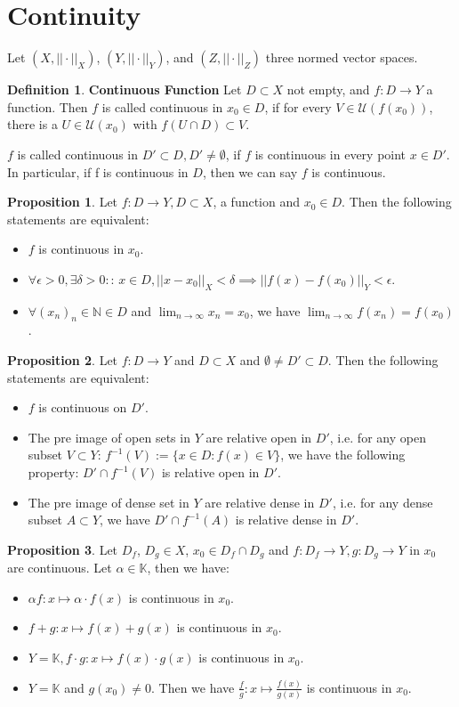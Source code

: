 \documentclass{article}
\theoremstyle{definition}
\newtheorem{defi}{Definition}[subsection]
\newtheorem{prop}{Proposition}[subsection]
\begin{document}
\section{Continuity}
Let $(X, ||\cdot||_X)$, $(Y, ||\cdot||_Y)$, and $(Z, ||\cdot||_Z)$ three normed vector spaces.
\begin{defi}
\textbf{Continuous Function} Let $D\subset X$ not empty, and $f: D\to Y$ a function. Then $f$ is called continuous in $x_0\in D$, if for every $V\in \mathcal{U}(f(x_0))$, there is a $U\in \mathcal{U}(x_0)$ with $f(U\cap D)\subset V$.

$f$ is called continuous in $D' \subset D, D' \neq \emptyset$, if $f$ is continuous in every point $x\in D'$. In particular, if f is continuous in $D$, then we can say $f$ is continuous. 
\end{defi}
\begin{prop}
Let $f: D\to Y, D\subset X$, a function and $x_0 \in D$. Then the following statements are equivalent:
\begin{itemize}
    \item $f$ is continuous in $x_0$.
    \item $\forall \epsilon>0, \exists\delta>0:$: $x\in D, ||x-x_0||_X <\delta \implies ||f(x)-f(x_0)||_Y<\epsilon$.
    \item $\forall (x_n)_n\in\mathbb{N}\in D$ and $\lim_{n\to\infty}x_n=x_0$, we have $\lim_{n\to\infty}f(x_n) = f(x_0)$.
\end{itemize}
\end{prop}
\begin{prop}
Let $f: D\to Y$ and $D\subset X$ and $\emptyset \neq D'\subset D$. Then the following statements are equivalent:
\begin{itemize}
    \item $f$ is continuous on $D'$.
    \item The pre image of open sets in $Y$ are relative open in $D'$, i.e. for any open subset $V\subset Y$: $f^{-1}(V):=\{x\in D: f(x)\in V\}$, we have the following property: $D'\cap f^{-1}(V)$ is relative open in $D'$.
    \item The pre image of dense set in $Y$ are relative dense in $D'$, i.e. for any dense subset $A\subset Y$, we have $D'\cap f^{-1}(A)$ is relative dense in $D'$.
\end{itemize}
\end{prop}
\begin{prop}
Let $D_f$, $D_g \in X$, $x_0\in D_f \cap D_g$ and $f: D_f \to Y, g: D_g \to Y$ in $x_0$ are continuous. Let $\alpha \in \mathbb{K}$, then we have:
\begin{itemize}
    \item $\alpha f: x\mapsto \alpha \cdot f(x)$ is continuous in $x_0$.
    \item $f+g: x\mapsto f(x)+g(x)$ is continuous in $x_0$.
    \item $Y=\mathbb{K}, f\cdot g: x\mapsto f(x)\cdot g(x)$ is continuous in $x_0$.
    \item $Y=\mathbb{K}$ and $g(x_0)\neq 0$. Then we have $\frac{f}{g}: x\mapsto \frac{f(x)}{g(x)}$ is continuous in $x_0$.
\end{itemize}
\end{prop}
\end{document}
